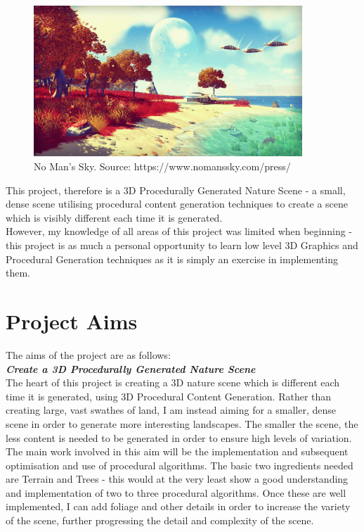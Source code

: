 \documentclass[a4paper,10pt]{report}
\begin{document}
\begin{figure}[h!]
    \centering
  \includegraphics[width=0.9\textwidth]{NoMansSky}
 \caption{No Man's Sky. Source: https://www.nomanssky.com/press/}
 \label{fig:no_mans_sky}
\end{figure}


This project, therefore is a 3D Procedurally Generated Nature Scene - a small, dense scene utilising procedural content generation techniques to create a  scene which is visibly different each time it is generated. \\

However, my knowledge of all areas of this project was limited when beginning - this project is as much a personal opportunity to learn low level 3D Graphics and Procedural Generation techniques as it is simply an exercise in implementing them. 

\section{Project Aims}
The aims of the project are as follows:\\

\textbf{\textit{Create a 3D Procedurally Generated Nature Scene}} \\

The heart of this project is creating a 3D nature scene which is different each time it is generated, using 3D Procedural Content Generation. Rather than creating large, vast swathes of land, I am instead aiming for a smaller, dense scene in order to generate more interesting landscapes. The smaller the scene, the less content is needed to be generated in order to ensure high levels of variation.\\

The main work involved in this aim will be the implementation and subsequent optimisation and use of procedural algorithms. The basic two ingredients needed are Terrain and Trees - this would at the very least show a good understanding and implementation of two to three procedural algorithms. Once these are well implemented, I can add foliage and other details in order to increase the variety of the scene, further progressing the detail and complexity of the scene.  \\
\end{document}
